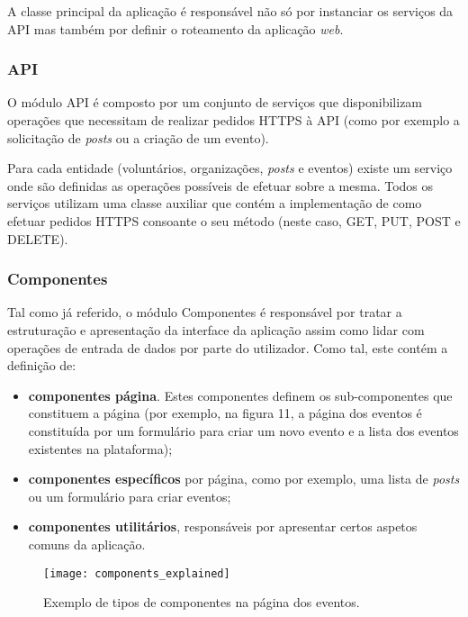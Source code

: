 \par \medskip

A classe principal da aplicação é responsável não só por instanciar os serviços da API mas também por definir o roteamento da aplicação \textit{web}.

\subsubsection{API}

O módulo API é composto por um conjunto de serviços que disponibilizam operações que necessitam de realizar pedidos HTTPS à API (como por exemplo a solicitação de \textit{posts} ou a criação de um evento).

\par \medskip

Para cada entidade (voluntários, organizações, \textit{posts} e eventos) existe um serviço onde são definidas as operações possíveis de efetuar sobre a mesma. Todos os serviços utilizam uma classe auxiliar que contém a implementação de como efetuar pedidos HTTPS consoante o seu método (neste caso, GET, PUT, POST e DELETE).

\subsubsection{Componentes}

Tal como já referido, o módulo Componentes é responsável por tratar a estruturação e apresentação da interface da aplicação assim como lidar com operações de entrada de dados por parte do utilizador. Como tal, este contém a definição de:

\begin{itemize}
	\item \textbf{componentes página}. Estes componentes definem os sub-componentes que constituem a página (por exemplo, na figura 11, a página dos eventos é constituída por um formulário para criar um novo evento e a lista dos eventos existentes na plataforma);
	\item \textbf{componentes específicos} por página, como por exemplo, uma lista de \textit{posts} ou um formulário para criar eventos;
	\item \textbf{componentes utilitários}, responsáveis por apresentar certos aspetos comuns da aplicação.
\end{itemize}

\begin{figure}[h]
	\centering
	\texttt{[image: components\_explained]}
	\caption{Exemplo de tipos de componentes na página dos eventos.}
\end{figure}

